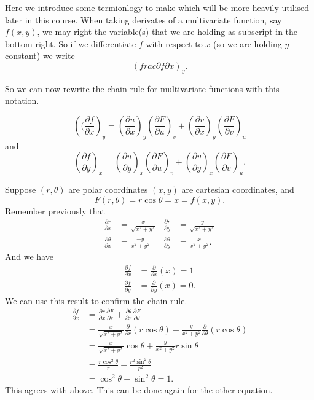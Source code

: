 
Here we introduce some termionlogy to make which will be more heavily utilised later in this course. When taking derivates of a multivariate function, say $f(x, y)$, we may right the variable(s) that we are holding as subscript in the bottom right. So if we differentiate $f$ with respect to $x$ (so we are holding $y$ constant) we write \[ \left(frac{\partial f}{\partial x}\right)_y. \] 

So we can now rewrite the chain rule for multivariate functions with this notation.

\[ \left((\frac{\partial f}{\partial x}\right)_y = \left(\frac{\partial u}{\partial x}\right)_y \left(\frac{\partial F}{\partial u}\right)_v + \left(\frac{\partial v}{\partial x}\right)_y\left(\frac{\partial F}{\partial v}\right)_u \] and \[ \left(\frac{\partial f}{\partial y}\right)_x = \left(\frac{\partial u}{\partial y}\right)_x \left(\frac{\partial F}{\partial u}\right)_v + \left(\frac{\partial v}{\partial y}\right)_x \left(\frac{\partial F}{\partial v}\right)_u. \]

\begin{example}
    Suppose $(r, \theta)$ are polar coordinates $(x, y)$ are cartesian coordinates, and \[ F(r, \theta) = r\cos\theta = x = f(x, y). \] Remember previously that
    \begin{align*}
        \frac{\partial r}{\partial x} &= \frac{x}{\sqrt{x^2 + y^2}} & \frac{\partial r}{\partial y} &= \frac{y}{\sqrt{x^2 + y^2}} \\
        \frac{\partial \theta}{\partial x} &= \frac{-y}{x^2 + y^2} & \frac{\partial \theta}{\partial y} &= \frac{x}{x^2 + y^2}. 
    \end{align*}
    And we have
    \begin{align*}
        \frac{\partial f}{\partial x} &= \frac{\partial}{\partial x} (x) = 1 \\
        \frac{\partial f}{\partial y} &= \frac{\partial}{\partial y} (x) = 0.
    \end{align*}
    We can use this result to confirm the chain rule.
    \begin{align*}
        \frac{\partial f}{\partial x} &= \frac{\partial r}{\partial x} \frac{\partial F}{\partial r} + \frac{\partial \theta}{\partial x} \frac{\partial F}{\partial \theta} \\
        &= \frac{x}{\sqrt{x^2 + y^2}} \frac{\partial}{\partial r} (r\cos{\theta}) - \frac{y}{x^2 + y^2} \frac{\partial}{\partial \theta} (r\cos{\theta}) \\
        &= \frac{x}{\sqrt{x^2 + y^2}} \cos{\theta} + \frac{y}{x^2 + y^2} r\sin{\theta} \\
        &= \frac{r\cos^2{\theta}}{r} + \frac{r^2 \sin^2{\theta}}{r^2} \\
        &= \cos^2{\theta} + \sin^2{\theta} = 1.
    \end{align*}
    This agrees with above. This can be done again for the other equation.
\end{example}


